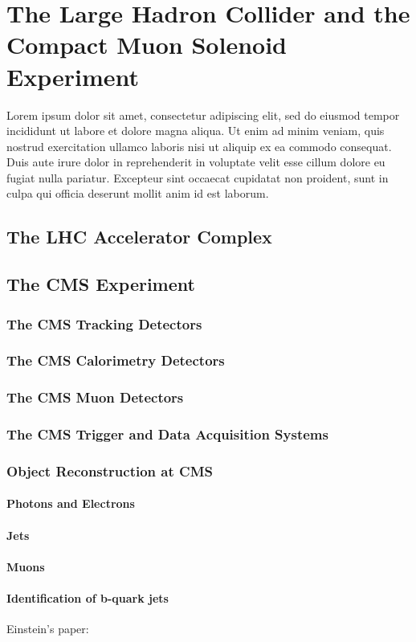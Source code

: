 \chapter{The Large Hadron Collider and the Compact Muon Solenoid Experiment}

Lorem ipsum dolor sit amet, consectetur adipiscing elit, sed do eiusmod tempor incididunt ut labore et dolore magna aliqua. Ut enim ad minim veniam, quis nostrud exercitation ullamco laboris nisi ut aliquip ex ea commodo consequat. Duis aute irure dolor in reprehenderit in voluptate velit esse cillum dolore eu fugiat nulla pariatur. Excepteur sint occaecat cupidatat non proident, sunt in culpa qui officia deserunt mollit anim id est laborum.

\section{The LHC Accelerator Complex}

\section{The CMS Experiment}
\subsection{The CMS Tracking Detectors}
\subsection{The CMS Calorimetry Detectors}
\subsection{The CMS Muon Detectors}
\subsection{The CMS Trigger and Data Acquisition Systems}
\subsection{Object Reconstruction at CMS}
\subsubsection{Photons and Electrons}
\subsubsection{Jets}
\subsubsection{Muons}
\subsubsection{Identification of b-quark jets}

Einstein's paper: \cite{Einstein}
